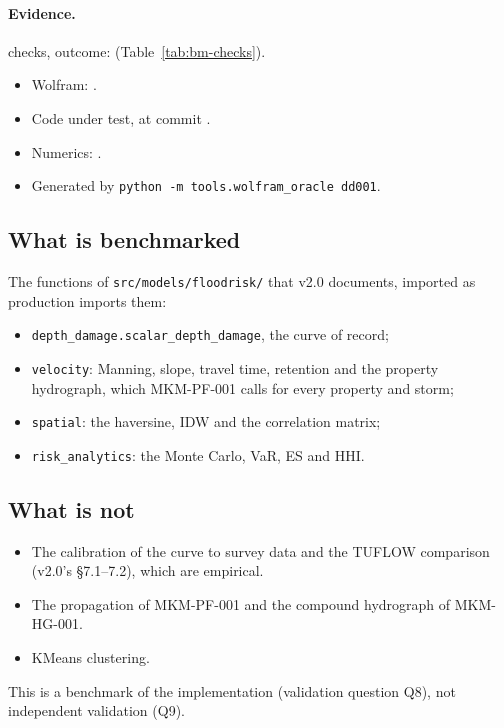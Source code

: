 \documentclass[11pt,a4paper]{article}
\begin{document}
\paragraph{Evidence.} \bmChecks{} checks, outcome: \bmOutcome{}
(Table~\ref{tab:bm-checks}).
\begin{itemize}[leftmargin=*,nosep]
\item Wolfram: \bmWolfram{}\bmWolframVia.
\item Code under test, at commit \bmCodeCommit{}\bmCodeDirty.
\item Numerics: \bmNumerics.
\item Generated \bmGenerated{} by \texttt{python -m tools.wolfram\_oracle dd001}.
\end{itemize}

\mkmpurpose

\subsection{What is benchmarked}
The functions of \texttt{src/models/floodrisk/} that v2.0 documents, imported as
production imports them:
\begin{itemize}[leftmargin=*,nosep]
\item \texttt{depth\_damage.scalar\_depth\_damage}, the curve of record;
\item \texttt{velocity}: Manning, slope, travel time, retention and the property
  hydrograph, which MKM-PF-001 calls for every property and storm;
\item \texttt{spatial}: the haversine, IDW and the correlation matrix;
\item \texttt{risk\_analytics}: the Monte Carlo, VaR, ES and HHI.
\end{itemize}

\subsection{What is not}
\begin{itemize}[leftmargin=*,nosep]
\item The calibration of the curve to survey data and the TUFLOW comparison (v2.0's
  \S7.1--7.2), which are empirical.
\item The propagation of MKM-PF-001 and the compound hydrograph of MKM-HG-001.
\item KMeans clustering.
\end{itemize}
This is a benchmark of the implementation (validation question Q8), not independent
validation (Q9).
\end{document}
